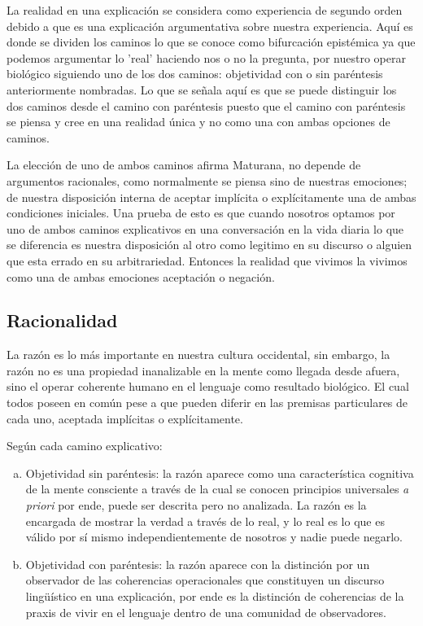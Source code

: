\documentclass[10pt]{article}
\begin{document}
        La realidad en una explicación se considera como experiencia de segundo orden debido a que es una explicación argumentativa sobre nuestra experiencia. Aquí es donde se dividen los caminos lo que se conoce como bifurcación epistémica ya que podemos argumentar lo 'real' haciendo nos o no la pregunta, por nuestro operar biológico siguiendo uno de los dos caminos: objetividad con o sin paréntesis anteriormente nombradas. Lo que se señala aquí es que se puede distinguir los dos caminos desde el camino con paréntesis puesto que el camino con paréntesis se piensa y cree en una realidad única y no como una con ambas opciones de caminos.

        La elección de uno de ambos caminos afirma Maturana, no depende de argumentos racionales, como normalmente se piensa sino de nuestras emociones; de nuestra disposición interna de aceptar implícita o explícitamente una de ambas condiciones iniciales. Una prueba de esto es que cuando nosotros optamos por uno de ambos caminos explicativos en una conversación en la vida diaria lo que se diferencia es nuestra disposición al otro como legitimo en su discurso o alguien que esta errado en su arbitrariedad. Entonces la realidad que vivimos la vivimos como una de ambas emociones aceptación o negación.

        
        \subsection{Racionalidad}

        La razón es lo más importante en nuestra cultura occidental, sin embargo, la razón no es una propiedad inanalizable en la mente como llegada desde afuera, sino el operar coherente humano en el lenguaje como resultado biológico. El cual todos poseen en común pese a que pueden diferir en las premisas particulares de cada uno, aceptada implícitas o explícitamente. 
        
        Según cada camino explicativo:
        
        \begin{enumerate}[a.]
            \item Objetividad sin paréntesis: la razón aparece como una característica cognitiva de la mente consciente a través de la cual se conocen principios universales \textit{a priori} por ende, puede ser descrita pero no analizada. La razón es la encargada de mostrar la verdad a través de lo real, y lo real es lo que es válido por sí mismo independientemente de nosotros y nadie puede negarlo.
            \item Objetividad con paréntesis: la razón aparece con la distinción por un observador de las coherencias operacionales que constituyen un discurso lingüístico en una explicación, por ende es la distinción de coherencias de la praxis de vivir en el lenguaje dentro de una comunidad de observadores.
        \end{enumerate}
        
\end{document}
